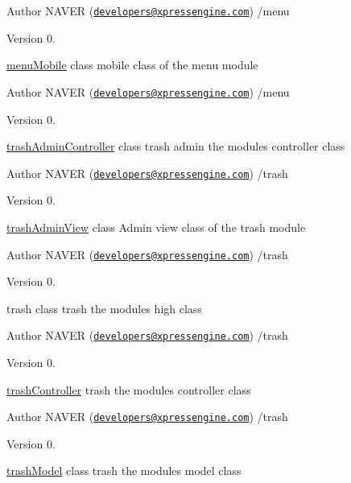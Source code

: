 \begin{DoxyAuthor}{Author}
N\+A\+V\+E\+R (\href{mailto:developers@xpressengine.com}{\tt developers@xpressengine.\+com}) /menu 
\end{DoxyAuthor}
\begin{DoxyVersion}{Version}
0.
\end{DoxyVersion}
\hyperlink{classmenuMobile}{menu\+Mobile} class mobile class of the menu module

\begin{DoxyAuthor}{Author}
N\+A\+V\+E\+R (\href{mailto:developers@xpressengine.com}{\tt developers@xpressengine.\+com}) /menu 
\end{DoxyAuthor}
\begin{DoxyVersion}{Version}
0.
\end{DoxyVersion}
\hyperlink{classtrashAdminController}{trash\+Admin\+Controller} class trash admin the module\textquotesingle{}s controller class

\begin{DoxyAuthor}{Author}
N\+A\+V\+E\+R (\href{mailto:developers@xpressengine.com}{\tt developers@xpressengine.\+com}) /trash 
\end{DoxyAuthor}
\begin{DoxyVersion}{Version}
0.
\end{DoxyVersion}
\hyperlink{classtrashAdminView}{trash\+Admin\+View} class Admin view class of the trash module

\begin{DoxyAuthor}{Author}
N\+A\+V\+E\+R (\href{mailto:developers@xpressengine.com}{\tt developers@xpressengine.\+com}) /trash 
\end{DoxyAuthor}
\begin{DoxyVersion}{Version}
0.
\end{DoxyVersion}
trash class trash the module\textquotesingle{}s high class

\begin{DoxyAuthor}{Author}
N\+A\+V\+E\+R (\href{mailto:developers@xpressengine.com}{\tt developers@xpressengine.\+com}) /trash 
\end{DoxyAuthor}
\begin{DoxyVersion}{Version}
0.
\end{DoxyVersion}
\hyperlink{classtrashController}{trash\+Controller} trash the module\textquotesingle{}s controller class

\begin{DoxyAuthor}{Author}
N\+A\+V\+E\+R (\href{mailto:developers@xpressengine.com}{\tt developers@xpressengine.\+com}) /trash 
\end{DoxyAuthor}
\begin{DoxyVersion}{Version}
0.
\end{DoxyVersion}
\hyperlink{classtrashModel}{trash\+Model} class trash the module\textquotesingle{}s model class

